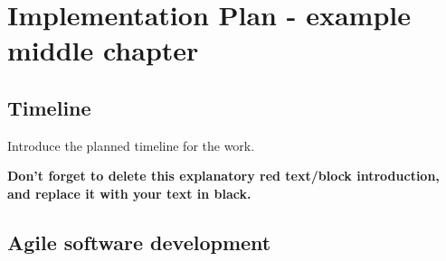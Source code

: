 \chapter{Implementation Plan - example middle chapter} %

\section{Timeline} %

\begin{tcolorbox}[      %
    boxrule=0pt,        %
    colback=white,      %
    coltext=red         %
]                       %
    Introduce the planned timeline for the work.
    
    \vspace{15pt}       %
    \begin{center}      %
    \textbf{Don't forget to delete this explanatory red text/block introduction, and replace it with your text in black.}
    \end{center}        %
\end{tcolorbox}         %

\section{Agile software development} %


